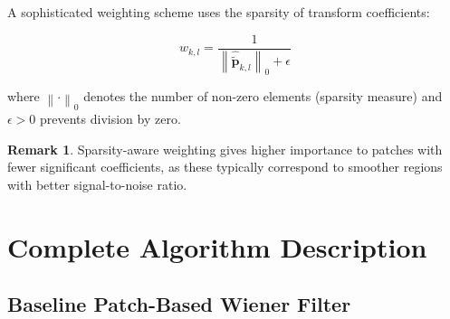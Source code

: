 \documentclass[12pt]{article}
\renewcommand{\vec}[1]{\mathbf{#1}}
\newcommand{\norm}[1]{\left\lVert#1\right\rVert}
\theoremstyle{definition}
\newtheorem{remark}[theorem]{Remark}
\begin{document}
A sophisticated weighting scheme uses the sparsity of transform coefficients:

\begin{equation}
    \label{eq:sparsity_weight}
    w_{k,l} = \frac{1}{\norm{\hat{\tilde{\vec{p}}}_{k,l}}_0 + \epsilon}
\end{equation}

where $\norm{\cdot}_0$ denotes the number of non-zero elements (sparsity measure) and $\epsilon > 0$ prevents division by zero.

\begin{remark}
    Sparsity-aware weighting gives higher importance to patches with fewer significant coefficients, as these typically correspond to smoother regions with better signal-to-noise ratio.
\end{remark}

\newpage


\section{Complete Algorithm Description}
\label{sec:algorithm}

\subsection{Baseline Patch-Based Wiener Filter}
\label{subsec:baseline_algorithm}
\end{document}
